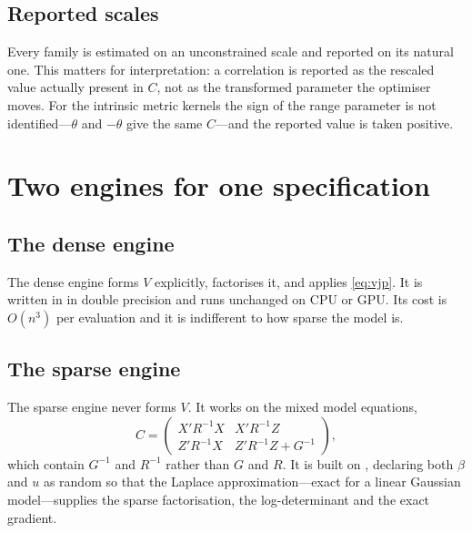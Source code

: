 \documentclass[article]{jss}
\begin{document}
\subsection{Reported scales}


Every family is estimated on an unconstrained scale and reported on its
natural one. This matters for interpretation: a correlation is reported as the
rescaled value actually present in $C$, not as the transformed parameter the
optimiser moves. For the intrinsic metric kernels the sign of the range
parameter is not identified---$\theta$ and $-\theta$ give the same $C$---and
the reported value is taken positive.

\section{Two engines for one specification}\label{sec:engines}

\subsection{The dense engine}

The dense engine forms $V$ explicitly, factorises it, and applies
\eqref{eq:vjp}. It is written in  in double precision and runs
unchanged on CPU or GPU. Its cost is $O(n^3)$ per evaluation and it is
indifferent to how sparse the model is.

\subsection{The sparse engine}

The sparse engine never forms $V$. It works on the mixed model equations,
%
\begin{equation}\label{eq:mme}
  C = \begin{pmatrix} X'R^{-1}X & X'R^{-1}Z \\
                      Z'R^{-1}X & Z'R^{-1}Z + G^{-1} \end{pmatrix},
\end{equation}
%
which contain $G^{-1}$ and $R^{-1}$ rather than $G$ and $R$. It is built on
 \citep{rtmb}, declaring both $\beta$ and $u$ as random so that the
Laplace approximation---exact for a linear Gaussian model---supplies the
sparse factorisation, the log-determinant and the exact gradient.
\end{document}

